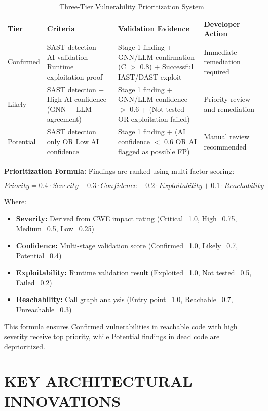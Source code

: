 {{{{\begin{table}[H]
\centering
\caption{Three-Tier Vulnerability Prioritization System}
\label{tab:prioritization}
\footnotesize
\begin{tabularx}{\textwidth}{|l|X|X|p{}|}
\hline
\textbf{Tier} & \textbf{Criteria} & \textbf{Validation Evidence} & \textbf{Developer Action} \\
\hline
Confirmed & SAST detection + AI validation + Runtime exploitation proof & Stage 1 finding + GNN/LLM confirmation (C $>$ 0.8) + Successful IAST/DAST exploit & Immediate remediation required \\
\hline
Likely & SAST detection + High AI confidence (GNN + LLM agreement) & Stage 1 finding + GNN/LLM confidence $>$ 0.6 + (Not tested OR exploitation failed) & Priority review and remediation \\
\hline
Potential & SAST detection only OR Low AI confidence & Stage 1 finding + (AI confidence $<$ 0.6 OR AI flagged as possible FP) & Manual review recommended \\
\hline
\end{tabularx}
\end{table}

\textbf{Prioritization Formula:} Findings are ranked using multi-factor scoring:

$$Priority = 0.4 \cdot Severity + 0.3 \cdot Confidence + 0.2 \cdot Exploitability + 0.1 \cdot Reachability$$

Where:
\begin{itemize}
\item \textbf{Severity:} Derived from CWE impact rating (Critical=1.0, High=0.75, Medium=0.5, Low=0.25)
\item \textbf{Confidence:} Multi-stage validation score (Confirmed=1.0, Likely=0.7, Potential=0.4)
\item \textbf{Exploitability:} Runtime validation result (Exploited=1.0, Not tested=0.5, Failed=0.2)
\item \textbf{Reachability:} Call graph analysis (Entry point=1.0, Reachable=0.7, Unreachable=0.3)
\end{itemize}

This formula ensures Confirmed vulnerabilities in reachable code with high severity receive top priority, while Potential findings in dead code are deprioritized.
}


  \section{\uppercase{Key Architectural Innovations}}
  }}}
